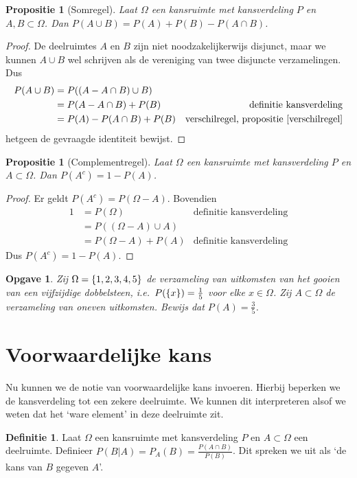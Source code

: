 \documentclass[a4paper]{book}
\newtheorem{proposition}[theorem]{Propositie}
\newtheorem{exercise}[theorem]{Opgave}
\theoremstyle{definition}
\newtheorem{definition}[theorem]{Definitie}
\begin{document}
\begin{proposition}[Somregel]\label{somregel}
    Laat $\Omega$ een kansruimte met kansverdeling $P$ en $A,B \subset \Omega$.
    Dan $P(A \cup B) = P(A) + P(B) - P(A \cap B)$.
\end{proposition}
\begin{proof}
    De deelruimtes $A$ en $B$ zijn niet noodzakelijkerwijs disjunct, maar we kunnen $A \cup B$ wel schrijven als de vereniging van twee disjuncte verzamelingen.
    Dus
    \begin{align*}
        P(A \cup B)     &= P( (A - A \cap B) \cup B) \\
                        &= P(A - A \cap B) + P(B)  & \text{definitie kansverdeling}\\
                        &= P(A) - P(A \cap B) + P(B) & \text{verschilregel, propositie~\ref{verschilregel}}
    \end{align*}
    hetgeen de gevraagde identiteit bewijst.
\end{proof}

\begin{proposition}[Complementregel]\label{complementregel}
    Laat $\Omega$ een kansruimte met kansverdeling $P$ en $A \subset \Omega$.
    Dan $P(A^c) = 1 - P(A)$.
\end{proposition}
\begin{proof}
    Er geldt $P(A^c) = P(\Omega - A)$.
    Bovendien
    \begin{align*}
        1 &= P(\Omega) & \text{definitie kansverdeling}\\
          &= P( (\Omega - A) \cup A) \\
          &= P(\Omega - A) + P(A) & \text{definitie kansverdeling}
    \end{align*}
    Dus $P(A^c) = 1 - P(A)$.
\end{proof}


\begin{exercise}
    Zij $\Omega = \set{1,2,3,4,5}$ de verzameling van uitkomsten van het gooien van een vijfzijdige dobbelsteen,
    i.e.\ $P(\set{x}) = \frac{1}{5}$ voor elke $x \in \Omega$.
    Zij $A \subset \Omega$ de verzameling van oneven uitkomsten.
    Bewijs dat $P(A) = \frac{3}{5}$.
\end{exercise}


\section{Voorwaardelijke kans}
Nu kunnen we de notie van voorwaardelijke kans invoeren.
Hierbij beperken we de kansverdeling tot een zekere deelruimte.
We kunnen dit interpreteren alsof we weten dat het `ware element' in deze deelruimte zit.
\begin{definition}
    Laat $\Omega$ een kansruimte met kansverdeling $P$ en $A \subset \Omega$ een deelruimte.
    Definieer $P(B|A) = P_A(B) = \frac{P(A \cap B)}{P(B)}$. Dit spreken we uit als `de kans van $B$ gegeven $A$'.
\end{definition}
\end{document}

